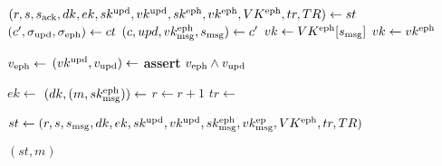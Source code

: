 \algrenewcommand\textproc{}
\algrenewcommand{}
\begin{minipage}{\linewidth}
  {\fontsize{10}{12}\selectfont
  \begin{algorithmic}[1]
    \State $(r,s,s_\text{ack},dk,ek,sk^\text{upd},vk^\text{upd},
                        sk^\text{eph},vk^\text{eph},VK^\text{eph},tr,TR) \gets st$
    \State $(c',\sigma_\text{upd},\sigma_\text{eph}) \gets ct$
    \State $(c,upd,vk_\text{msg}^\text{eph},s_\text{msg}) \gets c'$
    \State $vk \gets VK^\text{eph}[s_\text{msg}]$
    \Else
    \State $vk \gets vk^\text{eph}$
    \EndIf

    \State $v_\text{eph} \gets$
    \State $(vk^\text{upd},v_\text{upd}) \gets$
    \State \textbf{assert} $v_\text{eph} \wedge v_\text{upd}$

    \State $ek \gets$  
    \State $(dk, (m,sk_\text{msg}^\text{eph})) \gets$
    \State $r \gets r +1$
    \State $tr \gets$ 
    
    \State $st \gets (r,s,s_\text{msg},dk,ek,sk^\text{upd},vk^\text{upd},
                        sk_\text{msg}^\text{eph},vk_\text{msg}^\text{ep},VK^\text{eph},tr,TR)$

    \State \Return $(st,m)$
    \EndProcedure
  \end{algorithmic}
  }
\end{minipage}
